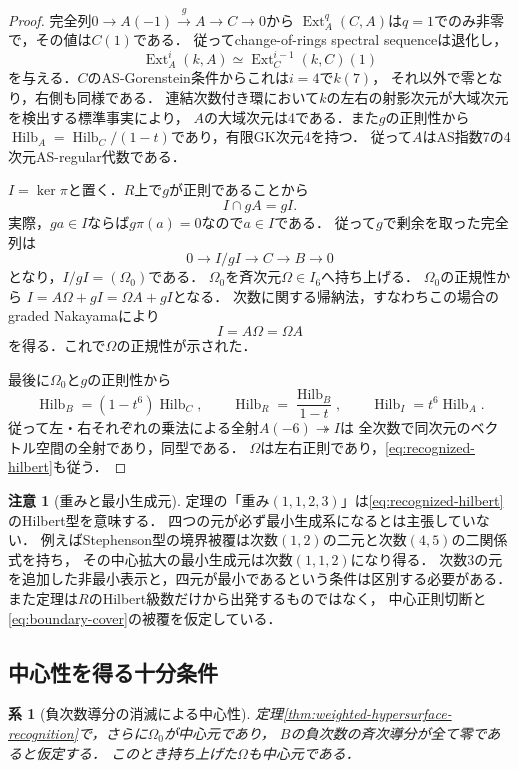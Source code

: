 \documentclass[11pt,a4paper]{ltjsarticle}
\newtheorem{corollary}[theorem]{系}
\theoremstyle{definition}
\newtheorem{remark}[theorem]{注意}
\newcommand{\Ext}{\operatorname{Ext}}
\newcommand{\Hilb}{\operatorname{Hilb}}
\begin{document}
\begin{proof}
完全列$0\to A(-1)\xrightarrow{g}A\to C\to0$から
$\Ext_A^q(C,A)$は$q=1$でのみ非零で，その値は$C(1)$である．
従ってchange-of-rings spectral sequenceは退化し，
\[
 \Ext_A^i(k,A)\simeq\Ext_C^{i-1}(k,C)(1)
\]
を与える．$C$のAS-Gorenstein条件からこれは$i=4$で$k(7)$，
それ以外で零となり，右側も同様である．
連結次数付き環において$k$の左右の射影次元が大域次元を検出する標準事実\cite[Proposition 3.18(3)]{RR}により，
$A$の大域次元は4である．また$g$の正則性から
$\Hilb_A=\Hilb_C/(1-t)$であり，有限GK次元4を持つ．
従って$A$はAS指数7の4次元AS-regular代数である．

$I=\ker\pi$と置く．$R$上で$g$が正則であることから
\[
 I\cap gA=gI.
\]
実際，$ga\in I$ならば$g\pi(a)=0$なので$a\in I$である．
従って$g$で剰余を取った完全列は
\[
 0\longrightarrow I/gI\longrightarrow C\longrightarrow B\longrightarrow0
\]
となり，$I/gI=(\Omega_0)$である．
$\Omega_0$を斉次元$\Omega\in I_6$へ持ち上げる．
$\Omega_0$の正規性から
$I=A\Omega+gI=\Omega A+gI$となる．
次数に関する帰納法，すなわちこの場合のgraded Nakayamaにより
\[
 I=A\Omega=\Omega A
\]
を得る．これで$\Omega$の正規性が示された．

最後に$\Omega_0$と$g$の正則性から
\[
 \Hilb_B=(1-t^6)\Hilb_C,\qquad
 \Hilb_R=\frac{\Hilb_B}{1-t},\qquad
 \Hilb_I=t^6\Hilb_A.
\]
従って左・右それぞれの乗法による全射$A(-6)\twoheadrightarrow I$は
全次数で同次元のベクトル空間の全射であり，同型である．
$\Omega$は左右正則であり，\eqref{eq:recognized-hilbert}も従う．
\end{proof}

\begin{remark}[重みと最小生成元]
定理の「重み$(1,1,2,3)$」は\eqref{eq:recognized-hilbert}のHilbert型を意味する．
四つの元が必ず最小生成系になるとは主張していない．
例えばStephenson型の境界被覆は次数$(1,2)$の二元と次数$(4,5)$の二関係式を持ち，
その中心拡大の最小生成元は次数$(1,1,2)$になり得る．
次数3の元を追加した非最小表示と，四元が最小であるという条件は区別する必要がある．
また定理は$R$のHilbert級数だけから出発するものではなく，
中心正則切断と\eqref{eq:boundary-cover}の被覆を仮定している．
\end{remark}

\subsection{中心性を得る十分条件}

\begin{corollary}[負次数導分の消滅による中心性]
\label{cor:central-sextic}
定理\ref{thm:weighted-hypersurface-recognition}で，さらに$\Omega_0$が中心元であり，
$B$の負次数の斉次導分が全て零であると仮定する．
このとき持ち上げた$\Omega$も中心元である．
\end{corollary}
\end{document}
